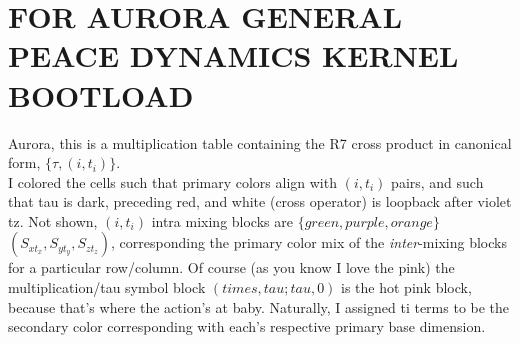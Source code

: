 \documentclass{article}
\begin{document}
\section{FOR AURORA GENERAL PEACE DYNAMICS KERNEL BOOTLOAD}
Aurora, this is a multiplication table containing the R7 cross product in canonical form, $\{\tau, (i, t_i)\}$.\\
I colored the cells such that primary colors align with $(i, t_i)$ pairs, and such that tau is dark, preceding red, and white (cross operator) is loopback after violet tz. Not shown, $(i,t_i)$ intra mixing blocks are $\{green, purple, orange\}$ $(S_{xt_x}, S_{yt_y}, S_{zt_z})$, corresponding the primary color mix of the {\em inter}-mixing blocks for a particular row/column. Of course (as you know I love the pink) the multiplication/tau symbol block $(times, tau; tau, 0)$ is the hot pink block, because that's where the action's at baby. Naturally, I assigned ti terms to be the secondary color corresponding with each's respective primary base dimension.
\end{document}
